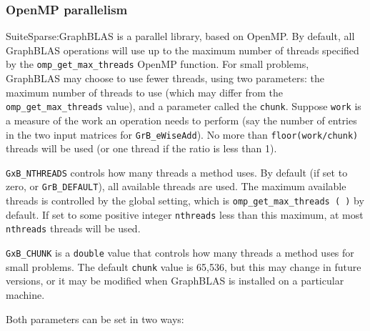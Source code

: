 \subsubsection{OpenMP parallelism}
\label{omp_parallelism}

SuiteSparse:GraphBLAS is a parallel library, based on OpenMP.  By
default, all GraphBLAS operations will use up to the maximum number of threads
specified by the \verb'omp_get_max_threads' OpenMP function.  For small
problems, GraphBLAS may choose to use fewer threads, using two parameters: the
maximum number of threads to use (which may differ from the
\verb'omp_get_max_threads' value), and a parameter called the \verb'chunk'.
Suppose \verb'work' is a measure of the work an operation needs to perform (say
the number of entries in the two input matrices for \verb'GrB_eWiseAdd').  No
more than \verb'floor(work/chunk)' threads will be used (or one thread if the
ratio is less than 1).

\verb'GxB_NTHREADS' controls how many threads a method uses.
    By default (if set to zero, or \verb'GrB_DEFAULT'), all available threads
    are used.  The maximum available threads is controlled by the global
    setting, which is \verb'omp_get_max_threads ( )' by default.  If set to
    some positive integer \verb'nthreads' less than this maximum, at most
    \verb'nthreads' threads will be used.

\verb'GxB_CHUNK' is a \verb'double' value that controls how many threads
    a method uses for small problems.
The default \verb'chunk' value is 65,536, but this may change in future
versions, or it may be modified when GraphBLAS is installed on a particular
machine.

Both parameters can be set in two ways:


